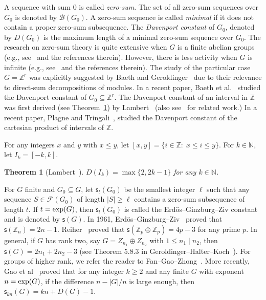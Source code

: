 \documentclass[12 pt]{amsart}
\newtheorem{theorem}{Theorem}
\def \F{\mathcal F}
\def \B{\mathcal B}
\def \Z{\mathbb Z}
\def \N{\mathbb N}
\def \Z{\mathbb Z}
\def \ls{\mathsf{s}}
\begin{document}
A sequence with sum $0$ is called {\em zero-sum}. The 
set of all zero-sum sequences over $G_0$ is denoted by 
$\B(G_0)$. A zero-sum sequence is called {\em minimal} if it does not contain a proper zero-sum subsequence.
The {\em Davenport constant} of $G_0$, denoted by $D(G_0)$ is the maximum length of a minimal zero-sum sequence over $G_0$.
The research on zero-sum theory is quite extensive 
when $G$ is a finite abelian groups (e.g., see~\cite{C,EGZ,Ga,GG} and the references therein). However, there is less activity 
when $G$ is infinite (e.g., see~\cite{BCRSS,CSS} and the references therein). The study of the particular case 
$G=\Z^r$ was explicitly suggested by Baeth and Geroldinger~\cite{BG} due to their relevance to direct-sum decompositions of modules.  In a recent paper, 
 Baeth et al.~\cite{BGGS} studied the Davenport constant of 
 $G_0\subseteq \Z^r$. The Davenport constant of an interval in 
$\Z$ was first derived (see Theorem~\ref{thm:La}) by Lambert~\cite{La} (also see~\cite{DGS,SST,Si} for related work.)
In a recent paper, Plagne and Tringali~\cite{PT}, studied the Davenport constant of the cartesian product of intervals of $\Z$. 

For any integers $x$ and $y$ with $x\leq y$, 
let $[x,y]=\{i\in \Z:\; x\leq i\leq y\}$. 
For $k\in\N$, let $I_k=[-k,k]$. 
%
\begin{theorem}[Lambert~\cite{La}]\label{thm:La}
$D(I_k)=\max\{2,2k-1\}$ for any $k\in\N$.
\end{theorem}
%
For $G$ finite and $G_0\subseteq G$, let $\ls_t(G_0)$ be the smallest integer $\ell$ such that any sequence $S\in\F(G_0)$ of length $|S|\ge \ell$ contains a zero-sum subsequence of length $t$.
If $t={\rm exp}(G)$, then $\ls_t(G_0)$ is called the 
Erd\"os--Ginzburg--Ziv constant and is denoted by $\ls(G)$.
In 1961, Erd\"os--Ginzburg--Ziv~\cite{EGZ} proved that $\ls(\Z_n)=2n-1$.  Reiher~\cite{Re} proved that $\ls(\Z_p\oplus \Z_p)=4p-3$ for any prime $p$. In general, if $G$ has rank two, say $G = Z_{n_1} \oplus Z_{n_2}$ with $1 \le n_1 \mid n_2$, then $\mathsf s (G) = 2n_1+2n_2-3$  (see Theorem 5.8.3 in Geroldinger--Halter--Koch~\cite{GHK}). For groups of higher rank, we refer the reader to Fan--Gao--Zhong~\cite{FGZ}. More recently, 
Gao et al~\cite{GHPS} proved that for any integer $k\geq2$ and any finite $G$ with exponent $n={\rm exp}(G)$, if the 
difference $n-|G|/n$ is large enough, then 
$\ls_{kn}(G)=kn+D(G)-1$. 
 
\end{document}
